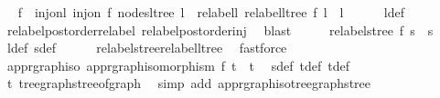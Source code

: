 \begin{isabellebody}
\ \isamarkupfalse%
\ f\ \ inj{\isacharunderscore}{\kern0pt}on{\isacharunderscore}{\kern0pt}l{\isacharprime}{\kern0pt}{\isacharcolon}{\kern0pt}\ {\isachardoublequoteopen}inj{\isacharunderscore}{\kern0pt}on\ f\ {\isacharparenleft}{\kern0pt}nodes{\isacharunderscore}{\kern0pt}ltree\ l{\isacharprime}{\kern0pt}{\isacharparenright}{\kern0pt}{\isachardoublequoteclose}\ \ relabel{\isacharunderscore}{\kern0pt}l{\isacharprime}{\kern0pt}{\isacharcolon}{\kern0pt}\ {\isachardoublequoteopen}relabel{\isacharunderscore}{\kern0pt}ltree\ f\ l{\isacharprime}{\kern0pt}\ {\isacharequal}{\kern0pt}\ l{\isachardoublequoteclose}\isanewline
\ \ \ \ \isamarkupfalse%
\ l{\isacharprime}{\kern0pt}{\isacharunderscore}{\kern0pt}def\ \isamarkupfalse%
\ relabel{\isacharunderscore}{\kern0pt}postorder{\isacharunderscore}{\kern0pt}relabel\ relabel{\isacharunderscore}{\kern0pt}postorder{\isacharunderscore}{\kern0pt}inj\ \isamarkupfalse%
\ blast\isanewline
\ \ \isamarkupfalse%
\ \isamarkupfalse%
\ {\isachardoublequoteopen}relabel{\isacharunderscore}{\kern0pt}stree\ f\ s{\isacharprime}{\kern0pt}\ {\isacharequal}{\kern0pt}\ s{\isachardoublequoteclose}\ \isamarkupfalse%
\ l{\isacharunderscore}{\kern0pt}def\ s{\isacharprime}{\kern0pt}{\isacharunderscore}{\kern0pt}def\isanewline
\ \ \ \ \isamarkupfalse%
\ relabel{\isacharunderscore}{\kern0pt}stree{\isacharunderscore}{\kern0pt}relabel{\isacharunderscore}{\kern0pt}ltree\ \isamarkupfalse%
\ fastforce\isanewline
\ \ \isamarkupfalse%
\ \isamarkupfalse%
\ app{\isacharunderscore}{\kern0pt}rgraph{\isacharunderscore}{\kern0pt}iso{\isacharcolon}{\kern0pt}\ {\isachardoublequoteopen}app{\isacharunderscore}{\kern0pt}rgraph{\isacharunderscore}{\kern0pt}isomorphism\ f\ t{\isacharprime}{\kern0pt}\ {\isacharequal}{\kern0pt}\ t{\isachardoublequoteclose}\ \isamarkupfalse%
\ s{\isacharunderscore}{\kern0pt}def\ t{\isacharprime}{\kern0pt}{\isacharunderscore}{\kern0pt}def\ t{\isacharunderscore}{\kern0pt}def\isanewline
\ \ \ \ \isamarkupfalse%
\ t{\isacharprime}{\kern0pt}\ tree{\isacharunderscore}{\kern0pt}graph{\isacharunderscore}{\kern0pt}stree{\isacharunderscore}{\kern0pt}of{\isacharunderscore}{\kern0pt}graph\ \isamarkupfalse%
\ {\isacharparenleft}{\kern0pt}simp\ add{\isacharcolon}{\kern0pt}\ app{\isacharunderscore}{\kern0pt}rgraph{\isacharunderscore}{\kern0pt}iso{\isacharunderscore}{\kern0pt}tree{\isacharunderscore}{\kern0pt}graph{\isacharunderscore}{\kern0pt}stree{\isacharparenright}{\kern0pt}\isanewline

\end{isabellebody}
